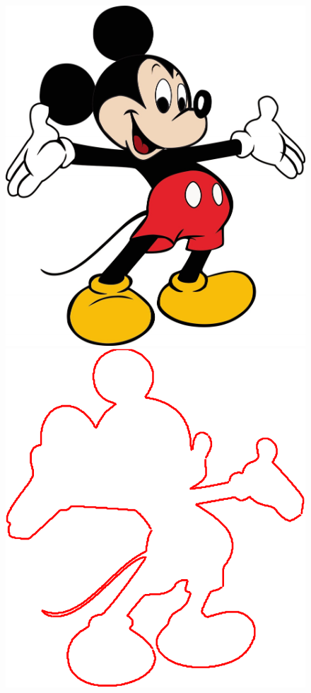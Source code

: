 \documentclass[10pt]{article}
\begin{document}
\begin{figure}

\centering
\begin{minipage}[t]{.24\textwidth}
\centering
\vspace{0pt}
    \includegraphics[scale=0.09]{mickey.jpg}
\end{minipage}
\begin{minipage}[t]{.24\textwidth}
\centering
\vspace{0pt}
    \includegraphics[scale=0.3]{mickey1-crop.pdf}

\end{minipage}
\end{figure}
\end{document}
